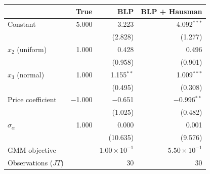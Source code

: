 \begin{tabular}{lrrr}
\toprule
 & True & BLP & BLP + Hausman \\
\midrule
Constant & 5.000 & 3.223 & 4.092$^{***}$ \\
 &  & (2.828) & (1.277) \\
$x_2$ (uniform) & 1.000 & 0.428 & 0.496 \\
 &  & (0.958) & (0.901) \\
$x_3$ (normal) & 1.000 & 1.155$^{**}$ & 1.009$^{***}$ \\
 &  & (0.495) & (0.308) \\
Price coefficient & $-$1.000 & $-$0.651 & $-$0.996$^{**}$ \\
 &  & (1.025) & (0.482) \\
$\sigma_\alpha$ & 1.000 & 0.000 & 0.001 \\
 &  & (10.635) & (9.576) \\
\midrule
GMM objective &  & $1.00\times10^{-1}$ & $5.50\times10^{-1}$ \\
Observations ($JT$) &  & 30 & 30 \\
\bottomrule
\end{tabular}
